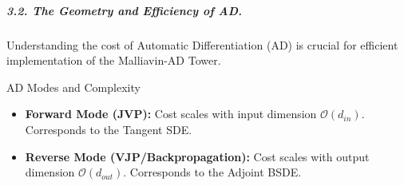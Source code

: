 \begin{figure}[ht]
\captionsetup{hypcap=false}
    \label{fig:QMC_Convergence_R3}
\end{figure}

\subparagraph{3.2. The Geometry and Efficiency of AD.}
Understanding the cost of Automatic Differentiation (AD) is crucial for efficient implementation of the Malliavin-AD Tower.

\begin{distilldef}{AD Modes and Complexity}
\begin{itemize}
    \item \textbf{Forward Mode (JVP):} Cost scales with input dimension $\mathcal{O}(d_{in})$. Corresponds to the Tangent SDE.
    \item \textbf{Reverse Mode (VJP/Backpropagation):} Cost scales with output dimension $\mathcal{O}(d_{out})$. Corresponds to the Adjoint BSDE.
\end{itemize}
\end{distilldef}

